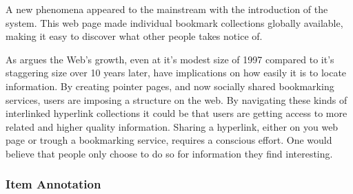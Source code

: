 A new phenomena appeared to the mainstream with the introduction of the
 system. This web page made individual
bookmark collections globally available, making it easy to discover what other
people takes notice of.




As \citet[p.~806]{dieberger97} argues the Web's growth, even at it's modest
size of 1997 compared to it's staggering size over 10 years later, have
implications on how easily it is to locate information. By creating pointer
pages, and now socially shared bookmarking services, users are imposing a
structure on the web. By navigating these kinds of interlinked hyperlink
collections it could be that users are getting access to more related and
higher quality information. Sharing a hyperlink, either on you web page or
trough a bookmarking service, requires a conscious effort. One would believe
that people only choose to do so for information they find interesting.

\subsubsection{Item Annotation}

